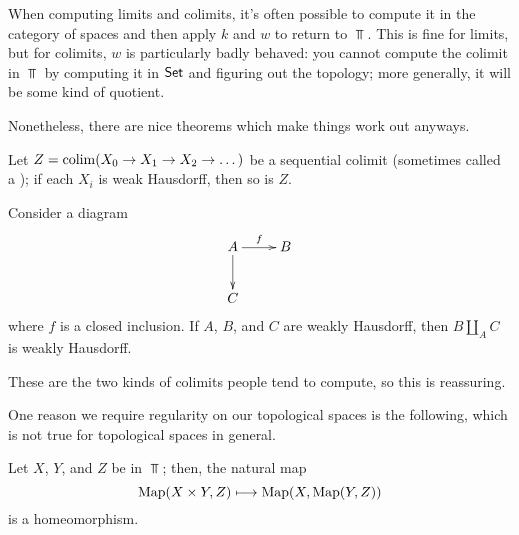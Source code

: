 When computing limits and colimits, it's often possible to compute it in the category of spaces and then apply $k$
and $w$ to return to $\Top$. This is fine for limits, but for colimits, $w$ is particularly badly behaved: you
cannot compute the colimit in $\Top$ by computing it in $\mathsf{Set}$ and figuring out the topology; more generally, it
will be some kind of quotient.

Nonetheless, there are nice theorems which make things work out anyways.
\begin{prop}
Let $Z = \operatorname*{colim}(X_0\to X_1\to X_2\to\dots)$ be a sequential colimit (sometimes called a ); if each
$X_i$ is weak Hausdorff, then so is $Z$.
\end{prop}
\begin{prop}
Consider a diagram
\[\xymatrix{
	A\ar[r]^f\ar[d] &B\\
	C
}\]
where $f$ is a closed inclusion. If $A$, $B$, and $C$ are weakly Hausdorff, then $B\amalg_A C$ is weakly Hausdorff.
\end{prop}
These are the two kinds of colimits people tend to compute, so this is reassuring.

One reason we require regularity on our topological spaces is the following, which is not true for topological
spaces in general.
\begin{lem}
Let $X$, $Y$, and $Z$ be in $\Top$; then, the natural map
\[\operatorname{Map}(X\times Y, Z)\longmapsto\operatorname{Map}(X, \operatorname{Map}(Y, Z))\]
is a homeomorphism.
\end{lem}
